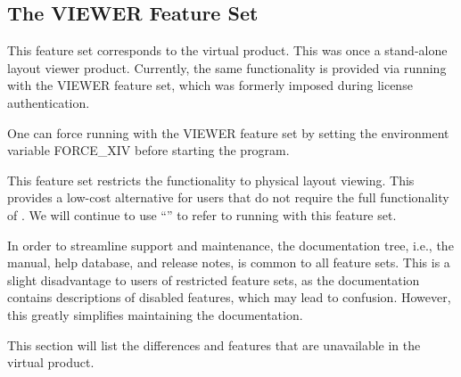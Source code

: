 \subsection{The VIEWER Feature Set}
This feature set corresponds to the {\Xiv} virtual product.  This was
once a stand-alone layout viewer product.  Currently, the same
functionality is provided via running {\Xic} with the VIEWER feature
set, which was formerly imposed during license authentication.

One can force running with the VIEWER feature set by setting the
environment variable {\et FORCE\_XIV} before starting the {\Xic}
program.

This feature set restricts the functionality to physical layout
viewing.  This provides a low-cost alternative for users that do not
require the full functionality of {\Xic}.  We will continue to use
``{\Xiv}'' to refer to {\Xic} running with this feature set.

In order to streamline support and maintenance, the documentation
tree, i.e., the manual, help database, and release notes, is common to
all feature sets.  This is a slight disadvantage to users of
restricted feature sets, as the documentation contains descriptions of
disabled features, which may lead to confusion.  However, this greatly
simplifies maintaining the documentation.

This section will list the differences and features that are
unavailable in the {\Xiv} virtual product.

